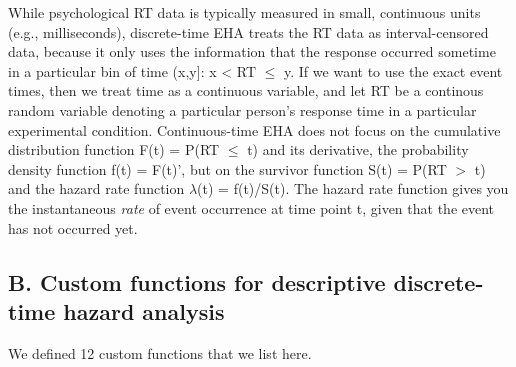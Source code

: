 \documentclass[
  man, donotrepeattitle,floatsintext]{apa6}
\begin{document}
While psychological RT data is typically measured in small, continuous units (e.g., milliseconds), discrete-time EHA treats the RT data as interval-censored data, because it only uses the information that the response occurred sometime in a particular bin of time (x,y{]}: x \textless{} RT \(\leq\) y. If we want to use the exact event times, then we treat time as a continuous variable, and let RT be a continous random variable denoting a particular person's response time in a particular experimental condition. Continuous-time EHA does not focus on the cumulative distribution function F(t) = P(RT \(\leq\) t) and its derivative, the probability density function f(t) = F(t)', but on the survivor function S(t) = P(RT \(>\) t) and the hazard rate function \(\lambda\)(t) = f(t)/S(t). The hazard rate function gives you the instantaneous \emph{rate} of event occurrence at time point t, given that the event has not occurred yet.

\subsection{B. Custom functions for descriptive discrete-time hazard analysis}\label{b.-custom-functions-for-descriptive-discrete-time-hazard-analysis}

We defined 12 custom functions that we list here.
\end{document}
